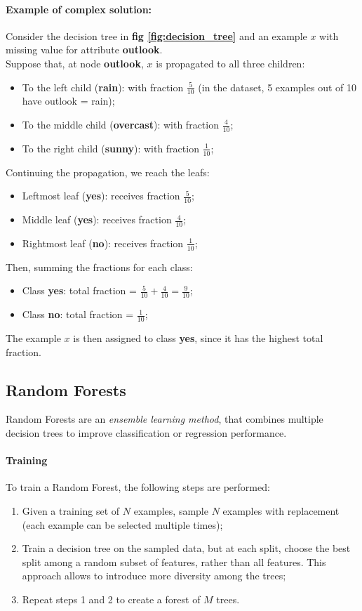 \paragraph{Example of complex solution:}
Consider the decision tree in \textbf{fig \ref{fig:decision_tree}} and an example $x$ with missing value for attribute \textbf{outlook}.
\\Suppose that, at node \textbf{outlook}, $x$ is propagated to all three children:
\begin{itemize}
    \item To the left child (\textbf{rain}): with fraction $\frac{5}{10}$ (in the dataset, 5 examples out of 10 have outlook = rain);
    \item To the middle child (\textbf{overcast}): with fraction $\frac{4}{10}$;
    \item To the right child (\textbf{sunny}): with fraction $\frac{1}{10}$;
\end{itemize}
Continuing the propagation, we reach the leafs:
\begin{itemize}
    \item Leftmost leaf (\textbf{yes}): receives fraction $\frac{5}{10}$;
    \item Middle leaf (\textbf{yes}): receives fraction $\frac{4}{10}$;
    \item Rightmost leaf (\textbf{no}): receives fraction $\frac{1}{10}$;
\end{itemize}
Then, summing the fractions for each class:
\begin{itemize}
    \item Class \textbf{yes}: total fraction = $\frac{5}{10} + \frac{4}{10} = \frac{9}{10}$;
    \item Class \textbf{no}: total fraction = $\frac{1}{10}$;
\end{itemize}
The example $x$ is then assigned to class \textbf{yes}, since it has the highest total fraction.

\subsection{Random Forests}
Random Forests are an \textit{ensemble learning method}, that combines multiple decision trees to improve classification or regression performance.
\paragraph{Training}
To train a Random Forest, the following steps are performed:
\begin{enumerate}
    \item Given a training set of $N$ examples, sample $N$ examples with replacement (each example can be selected multiple times);
    \item Train a decision tree on the sampled data, but at each split, choose the best split among a random subset of features, rather than all features.
    This approach allows to introduce more diversity among the trees;
    \item Repeat steps 1 and 2 to create a forest of $M$ trees.
\end{enumerate}

